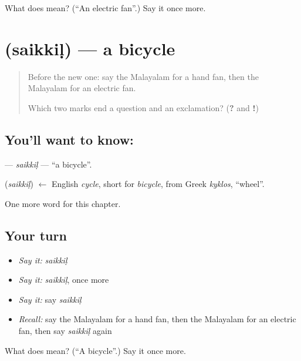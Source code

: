 \begin{tcolorbox}[breakable,colback=teal!4,colframe=teal!35!black,title={Before you move on}]
What does  mean? (\textquotedblleft{}An electric fan\textquotedblright{}.) Say it once more.
\end{tcolorbox}
\section[\texorpdfstring{\ml{സൈക്കിൾ} (saikkiḷ)}{സൈക്കിൾ (saikkiḷ)}]{ (saikkiḷ) — a bicycle}

\label{lesson:ML-C157-saikkil}



\begin{quote}
Before the new one: say the Malayalam for a hand fan, then the Malayalam for an electric fan.

Which two marks end a question and an exclamation? (\textbf{?} and \textbf{!})
\end{quote}

\subsection*{You'll want to know: }
\textbf{} — \emph{saikkiḷ} — \textquotedblleft{}a bicycle\textquotedblright{}.

\begin{cousinweb}
\textbf{} (\emph{saikkiḷ}) $\leftarrow$ English \emph{cycle}, short for \emph{bicycle}, from Greek \emph{kyklos}, \textquotedblleft{}wheel\textquotedblright{}.
\end{cousinweb}

\begin{grammarlens}[title={What you've built}]
One more word for this chapter.
\end{grammarlens}

\subsection*{Your turn}
\begin{itemize}
\raggedright
  \item \emph{Say it:} \emph{saikkiḷ}
  \item \emph{Say it:} \emph{saikkiḷ}, once more
  \item \emph{Say it:} say \emph{saikkiḷ}
  \item \emph{Recall:} say the Malayalam for a hand fan, then the Malayalam for an electric fan, then say \emph{saikkiḷ} again
\end{itemize}

\begin{tcolorbox}[breakable,colback=teal!4,colframe=teal!35!black,title={Before you move on}]
What does  mean? (\textquotedblleft{}A bicycle\textquotedblright{}.) Say it once more.
\end{tcolorbox}
